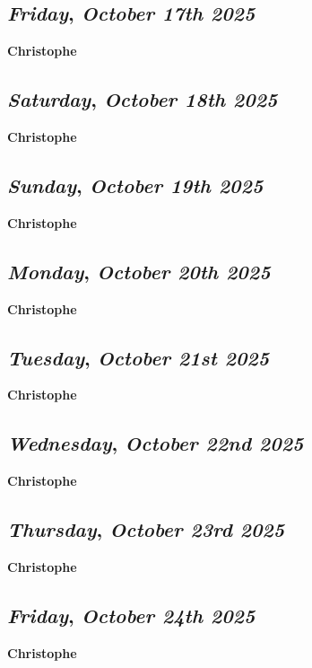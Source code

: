 \def\day{\textit{October 17th 2025}}
\def\weekday{\textit{Friday}}
\subsection*{\weekday, \day}
\textbf {Christophe}

\def\day{\textit{October 18th 2025}}
\def\weekday{\textit{Saturday}}
\subsection*{\weekday, \day}
\textbf {Christophe}

\def\day{\textit{October 19th 2025}}
\def\weekday{\textit{Sunday}}
\subsection*{\weekday, \day}
\textbf {Christophe}

\def\day{\textit{October 20th 2025}}
\def\weekday{\textit{Monday}}
\subsection*{\weekday, \day}
\textbf {Christophe}

\def\day{\textit{October 21st 2025}}
\def\weekday{\textit{Tuesday}}
\subsection*{\weekday, \day}
\textbf {Christophe}

\def\day{\textit{October 22nd 2025}}
\def\weekday{\textit{Wednesday}}
\subsection*{\weekday, \day}
\textbf {Christophe}

\def\day{\textit{October 23rd 2025}}
\def\weekday{\textit{Thursday}}
\subsection*{\weekday, \day}
\textbf {Christophe}

\def\day{\textit{October 24th 2025}}
\def\weekday{\textit{Friday}}
\subsection*{\weekday, \day}
\textbf {Christophe}

\def\day{\textit{October 25th 2025}}
\def\weekday{\textit{Saturday}}

